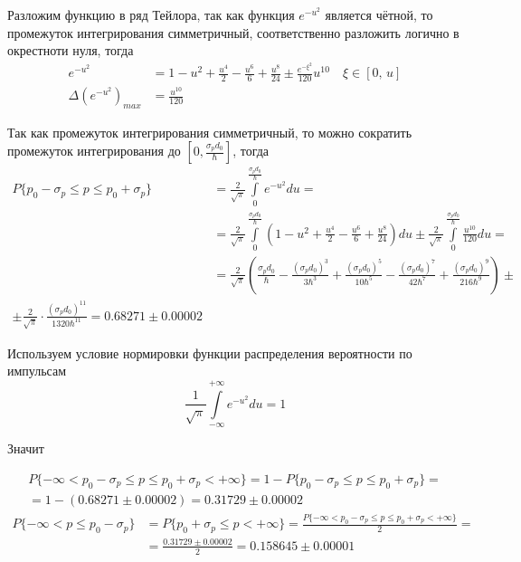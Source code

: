 \documentclass[12pt,a4paper]{article}
\begin{document}
Разложим функцию в ряд Тейлора, так как функция $e^{-u^2}$ является чётной, то промежуток интегрирования симметричный, соответственно разложить логично в окрестноти нуля, тогда
\begin{equation*}
\begin{aligned}
	e^{-u^2} &= 1 - u^2 + \frac{u^4}{2} - \frac{u^6}{6} + \frac{u^8}{24} \pm \frac{e^{-\xi^2}}{120}u^{10}\quad\xi\in[0,\, u] \\
	\Delta(e^{-u^2})_{max} &= \frac{u^{10}}{120}
\end{aligned}
\end{equation*}

Так как промежуток интегрирования симметричный, то можно сократить промежуток интегрирования до $[0, \frac{\sigma_pd_0}{\hbar}]$, тогда
\begin{equation*}
\begin{aligned}
	P\{p_0 - \sigma_p \leq p \leq p_0 + \sigma_p\} &= \frac{2}{\sqrt{\pi}}\int\limits_{0}^{\frac{\sigma_pd_0}{\hbar}}  e^{-u^2} du = \\
	&= \frac{2}{\sqrt{\pi}}\int\limits_{0}^{\frac{\sigma_pd_0}{\hbar}}  \left(1 - u^2 + \frac{u^4}{2} - \frac{u^6}{6} + \frac{u^8}{24}\right) du \pm \frac{2}{\sqrt{\pi}}\int\limits_{0}^{\frac{\sigma_pd_0}{\hbar}}  \frac{u^{10}}{120} du = \\
	&= \frac{2}{\sqrt{\pi}}\left(\frac{\sigma_pd_0}{\hbar} - \frac{(\sigma_pd_0)^3}{3\hbar^3} + \frac{(\sigma_pd_0)^5}{10\hbar^5} - \frac{(\sigma_pd_0)^7}{42\hbar^7} + \frac{(\sigma_pd_0)^9}{216\hbar^9}\right) \pm \\ \pm \frac{2}{\sqrt{\pi}}\cdot \frac{(\sigma_pd_0)^{11}}{1320\hbar^{11}} = 0.68271 \pm 0.00002
\end{aligned}
\end{equation*}

Используем условие нормировки функции распределения вероятности по импульсам 
\begin{equation*}
	\frac{1}{\sqrt{\pi}}\int\limits_{-\infty}^{+\infty}  e^{-u^2} du = 1
\end{equation*}

Значит 

\begin{equation*}
	\begin{aligned}
	P\{-\infty < p_0 - \sigma_p \leq p \leq p_0 + \sigma_p < +\infty\} = 1 - P\{p_0 - \sigma_p \leq p \leq p_0 + \sigma_p\} = \\ 
	= 1 - (0.68271 \pm 0.00002) = 0.31729 \pm 0.00002 
	\end{aligned}
\end{equation*}
\begin{equation*}
	\begin{aligned}
	P\{-\infty < p \leq p_0 - \sigma_p\} &= P\{p_0 + \sigma_p \le p < +\infty\} = \frac{P\{-\infty < p_0 - \sigma_p \leq p \leq p_0 + \sigma_p < +\infty\}}{2} = \\
	&= \frac{0.31729 \pm 0.00002}{2} = 0.158645 \pm 0.00001
	\end{aligned}
\end{equation*}
\end{document}
